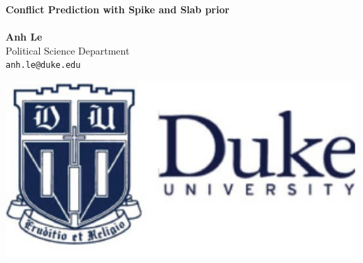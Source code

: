 \documentclass[a0,portrait]{a0poster}
\begin{document}


\begin{minipage}[b]{0.75\linewidth}
\veryHuge \color{NavyBlue} \textbf{Conflict Prediction with Spike and Slab prior} \color{Black}\\ %
\Huge\textit{}\\[2cm] %
\huge \textbf{Anh Le}\\[0.5cm] %
\huge Political Science Department\\[0.4cm] %
\Large \texttt{anh.le@duke.edu}\\
\end{minipage}
%
\begin{minipage}[b]{0.25\linewidth}
\includegraphics[width=20cm]{Duke-logo.jpg}\\
\end{minipage}

\vspace{1cm} %

\end{document}
